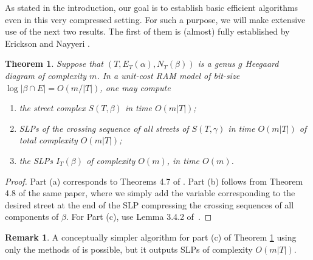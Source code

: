 \documentclass[11pt]{amsart}
\numberwithin{equation}{section}
\theoremstyle{plain}
\newtheorem{theorem}[equation]{Theorem}
\theoremstyle{definition}
\newtheorem{remark}[equation]{Remark}
\begin{document}
As stated in the introduction, our goal is to establish basic efficient algorithms even in this very compressed setting. For such a purpose, we will make extensive use of the next two results. 
The first of them is (almost) fully established by Erickson and Nayyeri \cite{erickson2002optimally}.

\begin{theorem}\label{th: erickson}
        Suppose that $(T,E_T(\alpha),N_T(\beta))$ is a genus $g$ Heegaard diagram of complexity $m$. In a unit-cost RAM model of bit-size $\log |\beta\cap E|=O(m/|T|)$, one may compute 
        \begin{enumerate}[label=(\alph*)]
            \item the street complex $S(T,\beta)$ in time $O(m|T|)$;
            \item SLPs of the crossing sequence of all streets of $S(T,\gamma)$ in time $O(m|T|)$ of \emph{total} complexity $O(m|T|)$;
             \item the SLPs $I_T(\beta)$ of complexity $O(m)$, in time $O(m)$.
        \end{enumerate}
\end{theorem}

 \begin{proof}
     Part (a) corresponds to Theorems 4.7 of \cite{Erickson2013}. 
     Part (b) follows from Theorem 4.8 of the same paper, where we simply add the variable corresponding to the desired street at the end of the SLP compressing the crossing sequences of all components of $\beta$. 
     For Part (c), use Lemma 3.4.2 of~\cite{Stefankovic}.
    \end{proof}
\begin{remark}
    A conceptually simpler algorithm for part (c) of Theorem \ref{th: erickson} using only the methods of \cite{Erickson2013} is possible, but it outputs SLPs of complexity $O(m|T|)$.
\end{remark}
\end{document}
